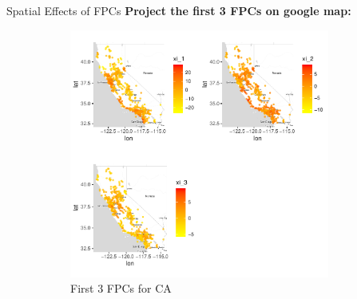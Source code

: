 \documentclass[final]{beamer}
\newlength{\sepwidth}
\newlength{\colwidth}
\newcommand{\separatorcolumn}{\begin{column}{\sepwidth}\end{column}}
\begin{document}
\begin{frame}[t]
\begin{columns}[t]
\separatorcolumn



\begin{column}{\colwidth}

  \vspace{-1em}


  \begin{block}{Spatial Effects of FPCs}
  \textbf{Project the first 3 FPCs on google map:}
  \vspace{-2em}
\begin{figure}[h]
  \begin{subfigure}{0.52\textwidth}
    \centering
    \includegraphics[width=1.05\linewidth]{figure/fpc_CA.pdf}
    \caption{First 3 FPCs for CA}
  \end{subfigure}%
    \begin{subfigure}{0.52\textwidth}
    \centering

\end{subfigure}
\end{figure}
\end{block}
\end{column}
\end{columns}
\end{frame}
\end{document}
